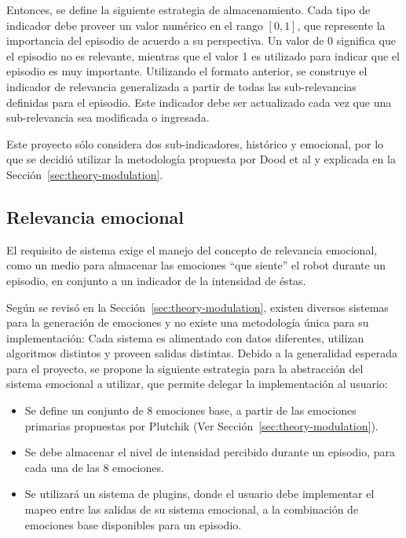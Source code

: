 Entonces, se define la siguiente estrategia de almacenamiento. Cada tipo de indicador debe proveer un valor numérico en el rango $[0, 1]$, que represente la importancia del episodio de acuerdo a su perspectiva. Un valor de 0 significa que el episodio no es relevante, mientras que el valor 1 es utilizado para indicar que el episodio es muy importante. Utilizando el formato anterior, se construye el indicador de relevancia generalizada a partir de todas las sub-relevancias definidas para el episodio. Este indicador debe ser actualizado cada vez que una sub-relevancia sea modificada o ingresada.

Este proyecto sólo considera dos sub-indicadores, histórico y emocional, por lo que se decidió utilizar la metodología propuesta por Dood et al y explicada en la Sección~\ref{sec:theory-modulation}.


\subsection{Relevancia emocional}\label{sec:design_ep_rel_emo}

El requisito de sistema  exige el manejo del concepto de relevancia emocional, como un medio para almacenar las emociones ``que siente'' el robot durante un episodio, en conjunto a un indicador de la intensidad de éstas.


Según se revisó en la Sección~\ref{sec:theory-modulation}, existen diversos sistemas para la generación de emociones y no existe una metodología única para su implementación: Cada sistema es alimentado con datos diferentes, utilizan algoritmos distintos y proveen salidas distintas. Debido a la generalidad esperada para el proyecto, se propone la siguiente estrategia para la abstracción del sistema emocional a utilizar, que permite delegar la implementación al usuario:
\begin{itemize}
\item Se define un conjunto de 8 emociones base, a partir de las emociones primarias propuestas por Plutchik (Ver Sección~\ref{sec:theory-modulation}).
\item Se debe almacenar el nivel de intensidad percibido durante un episodio, para cada una de las 8 emociones.
\item Se utilizará un sistema de plugins, donde el usuario debe implementar el mapeo entre las salidas de su sistema emocional, a la combinación de emociones base disponibles para un episodio.
\end{itemize}

